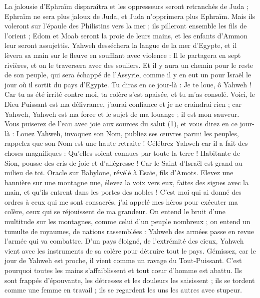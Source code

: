 \begin{multicols}{2}
La jalousie d'Ephraïm disparaîtra et les oppresseurs seront retranchés de Juda ; Ephraïm ne sera plus jaloux de Juda, et Juda n'opprimera plus Ephraïm.
Mais ils voleront sur l’épaule des Philistins vers la mer ; ils pilleront ensemble les fils de l'orient ; Edom et Moab seront la proie de leurs mains, et les enfants d’Ammon leur seront assujettis.
Yahweh desséchera la langue de la mer d'Egypte, et il lèvera sa main sur le fleuve en soufflant avec violence : Il le partagera en sept rivières, et on le traversera avec des souliers.
Et il y aura un chemin pour le reste de son peuple, qui sera échappé de l’Assyrie, comme il y en eut un pour Israël le jour où il sortit du pays d'Egypte.
\VerseOne{}Tu diras en ce jour-là : Je te loue, ô Yahweh ! Car tu as été irrité contre moi, ta colère s'est apaisée, et tu m'as consolé.
Voici, le Dieu Puissant est ma délivrance, j'aurai confiance et je ne craindrai rien ; car Yahweh, Yahweh est ma force et le sujet de ma louange ; il est mon sauveur.
Vous puiserez de l’eau avec joie aux sources du salut (1),
et vous direz en ce jour-là : Louez Yahweh, invoquez son Nom, publiez ses œuvres parmi les peuples, rappelez que son Nom est une haute retraite !
Célébrez Yahweh car il a fait des choses magnifiques : Qu'elles soient connues par toute la terre !
Habitante de Sion, pousse des cris de joie et d’allégresse ! Car le Saint d'Israël est grand au milieu de toi.
\VerseOne{}Oracle sur Babylone, révélé à Esaïe, fils d'Amots.
Elevez une bannière sur une montagne nue, élevez la voix vers eux, faites des signes avec la main, et qu’ils entrent dans les portes des nobles !
C'est moi qui ai donné des ordres à ceux qui me sont consacrés, j'ai appelé mes héros pour exécuter ma colère, ceux qui se réjouissent de ma grandeur.
On entend le bruit d’une multitude sur les montagnes, comme celui d’un peuple nombreux ; on entend un tumulte de royaumes, de nations rassemblées : Yahweh des armées passe en revue l'armée qui va combattre.
D’un pays éloigné, de l’extrémité des cieux, Yahweh vient avec les instruments de sa colère pour détruire tout le pays.
Gémissez, car le jour de Yahweh est proche, il vient comme un ravage du Tout-Puissant.
C'est pourquoi toutes les mains s’affaiblissent et tout cœur d'homme est abattu.
Ils sont frappés d’épouvante, les détresses et les douleurs les saisissent ; ils se tordent comme une femme en travail ; ils se regardent les uns les autres avec stupeur.

\end{multicols}
